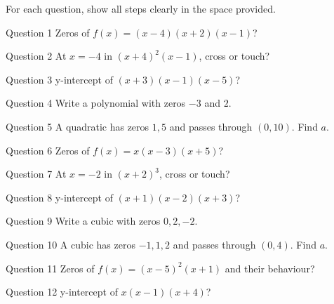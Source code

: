 \documentclass[11pt]{article}
\begin{document}
\clearpage
{}
For each question, show all steps clearly in the space provided.

\begin{qbox}{Question 1}
Zeros of $f(x)=(x-4)(x+2)(x-1)$?\workspace{2.4cm}
\end{qbox}

\begin{qbox}{Question 2}
At $x=-4$ in $(x+4)^2(x-1)$, cross or touch?\workspace{2.4cm}
\end{qbox}

\begin{qbox}{Question 3}
y-intercept of $(x+3)(x-1)(x-5)$?\workspace{2.4cm}
\end{qbox}

\begin{qbox}{Question 4}
Write a polynomial with zeros $-3$ and $2$.\workspace{2.4cm}
\end{qbox}

\begin{qbox}{Question 5}
A quadratic has zeros $1,5$ and passes through $(0,10)$. Find $a$.\workspace{2.4cm}
\end{qbox}

\begin{qbox}{Question 6}
Zeros of $f(x)=x(x-3)(x+5)$?\workspace{2.4cm}
\end{qbox}

\begin{qbox}{Question 7}
At $x=-2$ in $(x+2)^3$, cross or touch?\workspace{2.4cm}
\end{qbox}

\begin{qbox}{Question 8}
y-intercept of $(x+1)(x-2)(x+3)$?\workspace{2.4cm}
\end{qbox}

\begin{qbox}{Question 9}
Write a cubic with zeros $0,2,-2$.\workspace{2.4cm}
\end{qbox}

\begin{qbox}{Question 10}
A cubic has zeros $-1,1,2$ and passes through $(0,4)$. Find $a$.\workspace{2.4cm}
\end{qbox}

\begin{qbox}{Question 11}
Zeros of $f(x)=(x-5)^2(x+1)$ and their behaviour?\workspace{2.4cm}
\end{qbox}

\begin{qbox}{Question 12}
y-intercept of $x(x-1)(x+4)$?\workspace{2.4cm}
\end{qbox}
\end{document}
